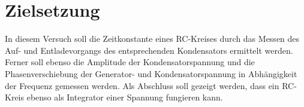 \section{Zielsetzung}
\label{sec:Zielsetzung}
In diesem Versuch soll die Zeitkonstante eines RC-Kreises durch das Messen des Auf- und Entladevorgangs des entsprechenden Kondensators ermittelt werden.
Ferner soll ebenso die Amplitude der Kondensatorspannung und die Phasenverschiebung der Generator- und Kondensatorspannung in Abhängigkeit der Frequenz gemessen werden.
Als Abschluss soll gezeigt werden, dass ein RC-Kreis ebenso als Integrator einer Spannung fungieren kann.
